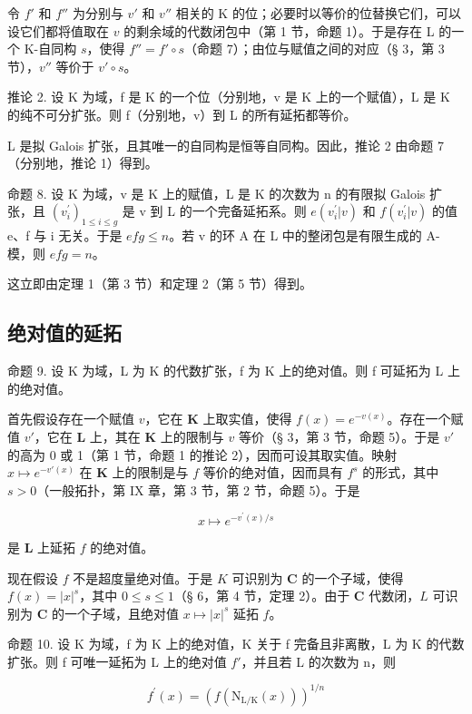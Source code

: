 令 \(f'\) 和 \(f''\) 为分别与 \(v'\) 和 \(v''\) 相关的 K 的位；必要时以等价的位替换它们，可以设它们都将值取在 \(v\) 的剩余域的代数闭包中（第 1 节，命题 1）。于是存在 L 的一个 K-自同构 \(s\)，使得 \(f'' = f' \circ s\)（命题 7）；由位与赋值之间的对应（§ 3，第 3 节），\(v''\) 等价于 \(v' \circ s\)。

推论 2. 设 K 为域，f 是 K 的一个位（分别地，v 是 K 上的一个赋值），L 是 K 的纯不可分扩张。则 f（分别地，v）到 L 的所有延拓都等价。

L 是拟 Galois 扩张，且其唯一的自同构是恒等自同构。因此，推论 2 由命题 7（分别地，推论 1）得到。

命题 8. 设 K 为域，v 是 K 上的赋值，L 是 K 的次数为 n 的有限拟 Galois 扩张，且 \((v_{i}^{\prime})_{1\leq i\leq g}\) 是 v 到 L 的一个完备延拓系。则 \(e(v_{i}^{\prime}|v)\) 和 \(f(v_{i}^{\prime}|v)\) 的值 e、f 与 i 无关。于是 \(efg \leqslant n\)。若 v 的环 A 在 L 中的整闭包是有限生成的 A-模，则 \(efg = n\)。

这立即由定理 1（第 3 节）和定理 2（第 5 节）得到。

\subsection{绝对值的延拓}

命题 9. 设 K 为域，L 为 K 的代数扩张，f 为 K 上的绝对值。则 f 可延拓为 L 上的绝对值。

首先假设存在一个赋值 \(v\)，它在 \(\mathbf{K}\) 上取实值，使得 \(f(x) = e^{-v(x)}\)。存在一个赋值 \(v'\)，它在 \(\mathbf{L}\) 上，其在 \(\mathbf{K}\) 上的限制与 \(v\) 等价（§ 3，第 3 节，命题 5）。于是 \(v'\) 的高为 0 或 1（第 1 节，命题 1 的推论 2），因而可设其取实值。映射 \(x \mapsto e^{-v'(x)}\) 在 \(\mathbf{K}\) 上的限制是与 \(f\) 等价的绝对值，因而具有 \(f^s\) 的形式，其中 \(s > 0\)（一般拓扑，第 IX 章，第 3 节，第 2 节，命题 5）。于是

\[
x \mapsto e ^ {- v ^ {\prime} (x) / s}
\]

是 \(\mathbf{L}\) 上延拓 \(f\) 的绝对值。

现在假设 \(f\) 不是超度量绝对值。于是 \(K\) 可识别为 \(\mathbf{C}\) 的一个子域，使得 \(f(x) = |x|^s\)，其中 \(0 \leqslant s \leqslant 1\)（§ 6，第 4 节，定理 2）。由于 \(\mathbf{C}\) 代数闭，\(L\) 可识别为 \(\mathbf{C}\) 的一个子域，且绝对值 \(x \mapsto |x|^s\) 延拓 \(f\)。

命题 10. 设 K 为域，f 为 K 上的绝对值，K 关于 f 完备且非离散，L 为 K 的代数扩张。则 f 可唯一延拓为 L 上的绝对值 \(f'\)，并且若 L 的次数为 n，则

\[
f ^ {\prime} (x) = \left(f (\mathrm{N} _ {\mathrm{L/K}} (x))\right) ^ {1 / n}
\]

